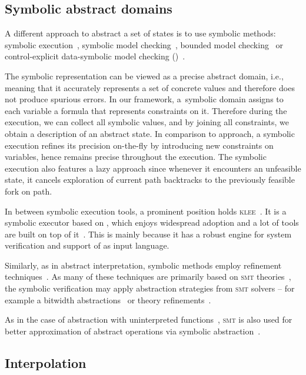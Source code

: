\subsection{Symbolic abstract domains}

A different approach to abstract a set of states is to use symbolic methods:
symbolic execution~\cite{King76, Cadar2013symbolic, Baldoni2018survey}, symbolic model
checking~\cite{Clarke96, McMillan93, Cimatti20}, bounded model
checking~\cite{Biere2003bounded} or control-explicit data-symbolic model
checking (\ceds)~\cite{Mrazek2016}.

The symbolic representation can be viewed as a precise abstract domain, i.e.,
meaning that it accurately represents a set of concrete values and therefore
does not produce spurious errors. In our framework, a~symbolic domain assigns
to each variable a formula that represents constraints on it. Therefore during
the execution, we can collect all symbolic values, and by joining all
constraints, we obtain a description of an abstract state. In comparison to
\cegar approach, a symbolic execution refines its precision on-the-fly by
introducing new constraints on variables, hence remains precise throughout the
execution. The symbolic execution also features a lazy approach since whenever
it encounters an unfeasible state, it cancels exploration of current path
backtracks to the previously feasible fork on path.

In between symbolic execution tools, a prominent position holds
\textsc{klee}~\cite{Cadar2008klee}. It is a symbolic executor based on \llvm,
which enjoys widespread adoption and a lot of tools are built on top of
it~\cite{Beyer2018Klee, Chalupa2018, Chen2018, Menezes2018}. This is mainly because it
has a robust engine for system verification and support of \llvm as input
language.

Similarly, as in abstract interpretation, symbolic methods employ refinement
techniques~\cite{Beyer2016}. As many of these techniques are primarily based on
\textsc{smt} theories~\cite{Beyer2018}, the symbolic verification may apply abstraction
strategies from \textsc{smt} solvers -- for example a bitwidth
abstractions~\cite{Jonavs2018} or theory refinements~\cite{Hyvarinen2017}.

As in the case of abstraction with uninterpreted functions~\cite{Gange2016}, \textsc{smt} is also used for better approximation of abstract operations via symbolic abstraction~\cite{Thakur2012}.

\subsection{Interpolation}
\label{sec:interpolation}


